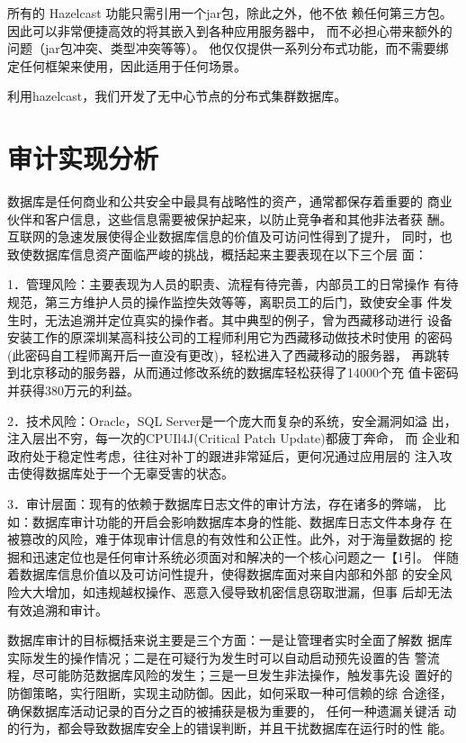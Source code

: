     所有的 Hazelcast 功能只需引用一个jar包，除此之外，他不依
    赖任何第三方包。因此可以非常便捷高效的将其嵌入到各种应用服务器中，
    而不必担心带来额外的问题（jar包冲突、类型冲突等等）。
    他仅仅提供一系列分布式功能，而不需要绑定任何框架来使用，因此适用于任何场景。

利用hazelcast，我们开发了无中心节点的分布式集群数据库。
\section{审计实现分析}
数据库是任何商业和公共安全中最具有战略性的资产，通常都保存着重要的
商业伙伴和客户信息，这些信息需要被保护起来，以防止竞争者和其他非法者获
酬。互联网的急速发展使得企业数据库信息的价值及可访问性得到了提升，
同时，也致使数据库信息资产面临严峻的挑战，概括起来主要表现在以下三个层
面：

1．管理风险：主要表现为人员的职责、流程有待完善，内部员工的日常操作
有待规范，第三方维护人员的操作监控失效等等，离职员工的后门，致使安全事
件发生时，无法追溯并定位真实的操作者。其中典型的例子，曾为西藏移动进行
设备安装工作的原深圳某高科技公司的工程师利用它为西藏移动做技术时使用
的密码(此密码自工程师离开后一直没有更改)，轻松进入了西藏移动的服务器，
再跳转到北京移动的服务器，从而通过修改系统的数据库轻松获得了14000个充
值卡密码并获得380万元的利益。

2．技术风险：Oracle，SQL Server是一个庞大而复杂的系统，安全漏洞如溢
出， 注入层出不穷，每一次的CPUIl4J(Critical Patch Update)都疲丁奔命， 而
企业和政府处于稳定性考虑，往往对补丁的跟进非常延后，更何况通过应用层的
注入攻击使得数据库处于一个无辜受害的状态。

3．审计层面：现有的依赖于数据库日志文件的审计方法，存在诸多的弊端，
比如：数据库审计功能的开启会影响数据库本身的性能、数据库日志文件本身存
在被篡改的风险，难于体现审计信息的有效性和公正性。此外，对于海量数据的
挖掘和迅速定位也是任何审计系统必须面对和解决的一个核心问题之一【1引。
伴随着数据库信息价值以及可访问性提升，使得数据库面对来自内部和外部
的安全风险大大增加，如违规越权操作、恶意入侵导致机密信息窃取泄漏，但事
后却无法有效追溯和审计。

数据库审计的目标概括来说主要是三个方面：一是让管理者实时全面了解数
据库实际发生的操作情况；二是在可疑行为发生时可以自动启动预先设置的告
警流程，尽可能防范数据库风险的发生；三是一旦发生非法操作，触发事先设
置好的防御策略，实行阻断，实现主动防御。因此，如何采取一种可信赖的综
合途径，确保数据库活动记录的百分之百的被捕获是极为重要的，
任何一种遗漏关键活
动的行为，都会导致数据库安全上的错误判断，并且干扰数据库在运行时的性
能。

